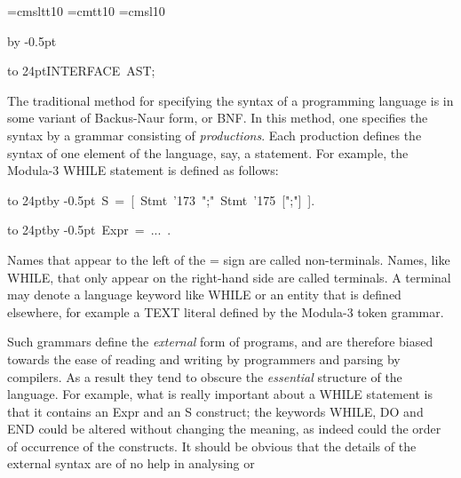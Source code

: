 {%
%
%
\font\ttslant=cmsltt10
\font\ttstraight=cmtt10
\font\rmslant=cmsl10
\def\tt{\ttstraight}
\def\indentation{24pt}
\def\tab{$ $\hbox to \indentation{\hss}}
\long\def\procspec#1{{\advance\leftskip by \indentation
  \noindent\rightskip = 0pt plus2em\rmslant\def\tt{\ttslant}\ignorerm#1}}
\def\ignorerm\rm{}
\def\display{\tab\parskip=0pt\advance\baselineskip by -0.5pt\tt }
\def\progmode{\advance\baselineskip by -0.5pt}
\par{\tt\parskip=0pt\parindent=0pt\progmode
\par\medskip \par
\tab INTERFACE~AST;}\par\medskip\noindent
{\rm  The traditional method for specifying the syntax of a programming
language is in some variant of Backus-Naur form, or BNF. In this
method, one specifies the syntax by a grammar consisting of {\it
productions}. Each production defines the syntax of one element of the
language, say, a statement. For example, the Modula-3 {\tt WHILE}
statement is defined as follows:
\par
\par\medskip {\display ~WhileSt~=~WHILE~Expr~DO~S~END.}\noindent\par
{\display ~S~=~[~Stmt~\char'173{}~";"~Stmt~\char'175{}~[";"]~].}\noindent\par
{\display ~Expr~=~...~.}\noindent\par
\medskip\noindent%
Names that appear to the left of the {\tt =} sign are called
{\tt non-terminals}.  Names, like {\tt WHILE}, that only appear on the
right-hand side are called {\tt terminals}. A terminal may denote a
language keyword like {\tt WHILE} or an entity that is defined elsewhere,
for example a {\tt TEXT} literal defined by the Modula-3 token grammar.
\par
Such grammars define the {\it external} form of programs, and are
therefore biased towards the ease of reading and writing by
programmers and parsing by compilers. As a result they tend to obscure
the {\it essential} structure of the language. For example, what is
really important about a {\tt WHILE} statement is that it contains an
{\tt Expr} and an {\tt S} construct; the keywords {\tt WHILE}, {\tt DO} and {\tt END}
could be altered without changing the meaning, as indeed could the
order of occurrence of the constructs. It should be obvious that the
details of the external syntax are of no help in analysing or
}}
